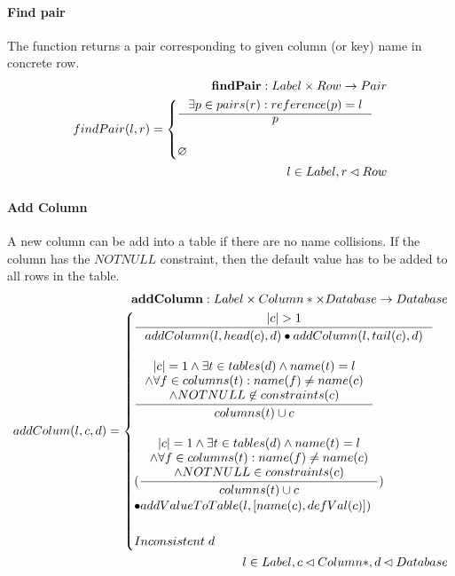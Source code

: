 \documentclass[11pt]{article}
\begin{document}
\paragraph{Find pair} The function returns a pair corresponding to given column (or key) name in concrete row.
\begin{align*}
\mathbf{findPair} : Label \times Row \rightarrow Pair \\
	findPair(l, r) = \begin{cases}
		\inference{\exists p \in pairs(r) : reference(p) = l}{p} \\ \\
			\varnothing
		\end{cases}\\
		l \in Label, r \lhd Row
\end{align*}

\paragraph{Add Column} A new column can be add into a table if there are no name collisions. If the column has the $NOTNULL$ constraint, then the default value has to be added to all rows in the table.
\begin{align*}
	\mathbf{addColumn} : Label \times Column* \times Database \rightarrow Database \\ 	
	addColum(l, c, d) = \begin{cases}
		\inference{|c| > 1}{addColumn(l, head(c), d) \bullet addColumn(l, tail(c), d)} \\ \\
		\inference{|c| = 1 \wedge \exists t \in tables(d) \wedge name(t) = l \\ \wedge \forall f \in columns(t) : name(f) \neq name(c) \\ \wedge NOTNULL \not \in constraints(c) }{columns(t) \cup c}\\ \\
		(\inference{|c| = 1 \wedge \exists t \in tables(d) \wedge name(t) = l \\ \wedge \forall f \in columns(t) : name(f) \neq name(c) \\ \wedge NOTNULL \in constraints(c) }{columns(t) \cup c})\\ \bullet addValueToTable(l, [name(c), defVal(c)]) \\ \\
		Inconsistent \;d 
	 \end{cases}\\ 
	 l \in Label, c \lhd Column*,d \lhd Database
\end{align*}
\end{document}
